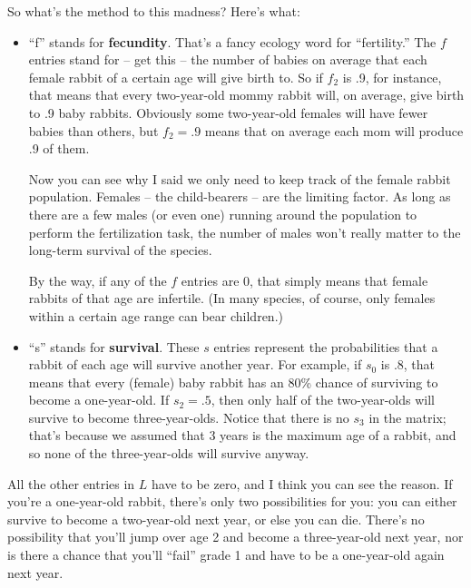 \begin{alttitles}
\medskip
So what's the method to this madness? Here's what:


\begin{itemize}
\itemsep.1em


\item ``f'' stands for \textbf{fecundity}. That's a fancy ecology word for
``fertility.'' The $f$ entries stand for -- get this -- the number of babies on
average that each female rabbit of a certain age will give birth to. So if
$f_2$ is .9, for instance, that means that every two-year-old mommy rabbit
will, on average, give birth to .9 baby rabbits. Obviously some two-year-old
females will have fewer babies than others, but $f_2=.9$ means that on average
each mom will produce .9 of them.

Now you can see why I said we only need to keep track of the female rabbit
population. Females -- the child-bearers -- are the limiting factor. As long as
there are a few males (or even one) running around the population to perform
the fertilization task, the number of males won't really matter to the
long-term survival of the species.

By the way, if any of the $f$ entries are 0, that simply means that female
rabbits of that age are infertile. (In many species, of course, only females
within a certain age range can bear children.)


\item ``s'' stands for \textbf{survival}. These $s$ entries represent the
probabilities that a rabbit of each age will survive another year. For example,
if $s_0$ is .8, that means that every (female) baby rabbit has an 80\% chance
of surviving to become a one-year-old. If $s_2=.5$, then only half of the
two-year-olds will survive to become three-year-olds. Notice that there is no
$s_3$ in the matrix; that's because we assumed that 3 years is the maximum age
of a rabbit, and so none of the three-year-olds will survive anyway.

\end{itemize}

All the other entries in $L$ have to be zero, and I think you can see the
reason. If you're a one-year-old rabbit, there's only two possibilities for
you: you can either survive to become a two-year-old next year, or else you can
die. There's no possibility that you'll jump over age 2 and become a
three-year-old next year, nor is there a chance that you'll ``fail'' grade 1
and have to be a one-year-old again next year.


\end{alttitles}
